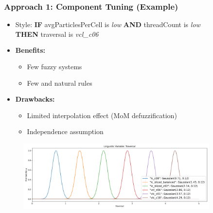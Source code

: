 \documentclass[
	10pt,
	t		%
]{beamer}
\begin{document}
\begin{frame}
	\frametitle{Approach 1: Component Tuning (Example)}
	\begin{itemize}
		\item Style: {\small \textbf{IF} avgParticlesPerCell is \textit{low} \textbf{AND} threadCount is \textit{low}\\ \qquad  \qquad \quad \textbf{THEN} traversal is \textit{vcl\_c06}}
		\item \textbf{Benefits:}
		      \begin{itemize}
			      \item Few fuzzy systems
			      \item Few and natural rules
		      \end{itemize}
		\item \textbf{Drawbacks:}
		      \begin{itemize}
			      \item Limited interpolation effect (MoM defuzzification)
			      \item Independence assumption
		      \end{itemize}


	\end{itemize}

	\begin{figure}
		\centering
		\includegraphics[width=0.9\textwidth,trim={0 0 0 1cm},clip]
		{figures/component-linguistic-variable.png}
	\end{figure}

\end{frame}
\end{document}
